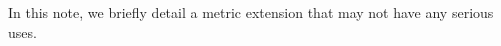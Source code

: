 \documentclass[12pt]{article}
\begin{document}
In this note, we briefly detail a metric extension that may not have any
serious uses.
\end{document}
